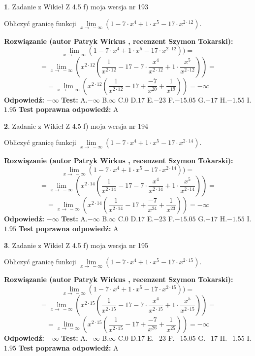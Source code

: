 \documentclass[12pt, a4paper]{article}
\theoremstyle{definition} %
\newtheorem{zad}{}
\newcommand{\zadStart}[1]{\begin{zad}#1\newline}
\newcommand{\zadStop}{\end{zad}}
\newcommand{\rozwStart}[2]{\noindent \textbf{Rozwiązanie (autor #1 , recenzent #2): }\newline}
\newcommand{\rozwStop}{\newline}
\newcommand{\odpStart}{\noindent \textbf{Odpowiedź:}\newline}
\newcommand{\odpStop}{\newline}
\newcommand{\testStart}{\noindent \textbf{Test:}\newline}
\newcommand{\testStop}{\newline}
\newcommand{\kluczStart}{\noindent \textbf{Test poprawna odpowiedź:}\newline}
\newcommand{\kluczStop}{\newline}
\begin{document}
\zadStart{Zadanie z Wikieł Z 4.5 f) moja wersja nr 193}


Obliczyć granicę funkcji  $\lim\limits_{x\to\ -\infty}(1 - 7 \cdot x^{4}+1 \cdot x^{5}- 17 \cdot x^{2\cdot12})$.
\zadStop
\rozwStart{Patryk Wirkus}{Szymon Tokarski}
$$\lim\limits_{x\to\ -\infty}(1 - 7 \cdot x^{4}+1 \cdot x^{5}- 17 \cdot x^{2\cdot12}))=$$
$$=\lim\limits_{x\to\ -\infty}(x^{2\cdot12}(\frac{1}{x^{2\cdot12}}-17 -7 \cdot \frac{x^{4}}{x^{2\cdot12}}+1 \cdot \frac{x^{5}}{x^{2\cdot12}}))=$$
$$=\lim\limits_{x\to\ -\infty}(x^{2\cdot12}(\frac{1}{x^{2\cdot12}}-17 + \frac{-7}{x^{20}}+ \frac{1}{x^{19}}))=-\infty$$
\rozwStop
\odpStart
$-\infty$
\odpStop
\testStart
A.$-\infty$ B.$\infty$ C.$0$ D.$17$ E.$-23$
F.$-15.05$ G.$-17$
H.$-1.55$
I.$1.95$
\testStop
\kluczStart
A
\kluczStop



\zadStart{Zadanie z Wikieł Z 4.5 f) moja wersja nr 194}


Obliczyć granicę funkcji  $\lim\limits_{x\to\ -\infty}(1 - 7 \cdot x^{4}+1 \cdot x^{5}- 17 \cdot x^{2\cdot14})$.
\zadStop
\rozwStart{Patryk Wirkus}{Szymon Tokarski}
$$\lim\limits_{x\to\ -\infty}(1 - 7 \cdot x^{4}+1 \cdot x^{5}- 17 \cdot x^{2\cdot14}))=$$
$$=\lim\limits_{x\to\ -\infty}(x^{2\cdot14}(\frac{1}{x^{2\cdot14}}-17 -7 \cdot \frac{x^{4}}{x^{2\cdot14}}+1 \cdot \frac{x^{5}}{x^{2\cdot14}}))=$$
$$=\lim\limits_{x\to\ -\infty}(x^{2\cdot14}(\frac{1}{x^{2\cdot14}}-17 + \frac{-7}{x^{24}}+ \frac{1}{x^{23}}))=-\infty$$
\rozwStop
\odpStart
$-\infty$
\odpStop
\testStart
A.$-\infty$ B.$\infty$ C.$0$ D.$17$ E.$-23$
F.$-15.05$ G.$-17$
H.$-1.55$
I.$1.95$
\testStop
\kluczStart
A
\kluczStop



\zadStart{Zadanie z Wikieł Z 4.5 f) moja wersja nr 195}


Obliczyć granicę funkcji  $\lim\limits_{x\to\ -\infty}(1 - 7 \cdot x^{4}+1 \cdot x^{5}- 17 \cdot x^{2\cdot15})$.
\zadStop
\rozwStart{Patryk Wirkus}{Szymon Tokarski}
$$\lim\limits_{x\to\ -\infty}(1 - 7 \cdot x^{4}+1 \cdot x^{5}- 17 \cdot x^{2\cdot15}))=$$
$$=\lim\limits_{x\to\ -\infty}(x^{2\cdot15}(\frac{1}{x^{2\cdot15}}-17 -7 \cdot \frac{x^{4}}{x^{2\cdot15}}+1 \cdot \frac{x^{5}}{x^{2\cdot15}}))=$$
$$=\lim\limits_{x\to\ -\infty}(x^{2\cdot15}(\frac{1}{x^{2\cdot15}}-17 + \frac{-7}{x^{26}}+ \frac{1}{x^{25}}))=-\infty$$
\rozwStop
\odpStart
$-\infty$
\odpStop
\testStart
A.$-\infty$ B.$\infty$ C.$0$ D.$17$ E.$-23$
F.$-15.05$ G.$-17$
H.$-1.55$
I.$1.95$
\testStop
\kluczStart
A
\kluczStop
\end{document}
